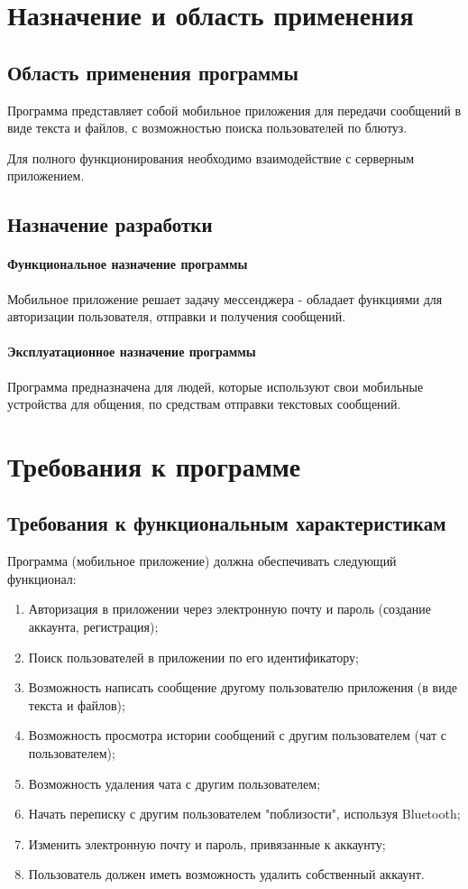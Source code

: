 \documentclass[explnote]{espd}
\begin{document}
\section{Назначение и область применения}
\subsection{Область применения программы}
Программа представляет собой мобильное приложения для передачи сообщений в виде текста и файлов, с возможностью поиска пользователей по блютуз.

Для полного функционирования необходимо взаимодействие с серверным приложением.

\subsection{Назначение разработки}
\paragraph{Функциональное назначение программы}
Мобильное приложение решает задачу мессенджера - обладает функциями для авторизации пользователя, отправки и получения сообщений.

\paragraph{Эксплуатационное назначение программы}
Программа предназначена для людей, которые используют свои мобильные устройства для общения, по средствам отправки текстовых сообщений.

\section{Требования к программе}
\subsection{Требования к функциональным характеристикам}

Программа (мобильное приложение) должна обеспечивать следующий функционал:

\begin{enumerate}
\item Авторизация в приложении через электронную почту и пароль (создание аккаунта, регистрация);
\item Поиск пользователей в приложении по его идентификатору;
\item Возможность написать сообщение другому пользователю приложения (в виде текста и файлов);
\item Возможность просмотра истории сообщений с другим пользователем (чат с пользователем);
\item Возможность удаления чата с другим пользователем;
\item Начать переписку с другим пользователем "поблизости", используя Bluetooth;
\item Изменить электронную почту и пароль, привязанные к аккаунту;
\item Пользователь должен иметь возможность удалить собственный аккаунт.
\end{enumerate}
\end{document}
